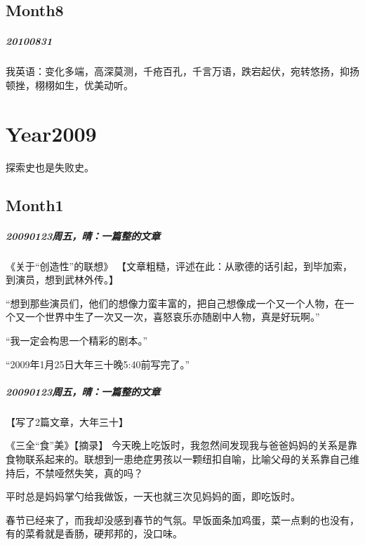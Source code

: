 \documentclass[UTF8]{Diaries}
\begin{document}
\section{Month8}
\paragraph{20100831}

我英语：变化多端，高深莫测，千疮百孔，千言万语，跌宕起伏，宛转悠扬，抑扬顿挫，栩栩如生，优美动听。 





\chapter{Year2009}

探索史也是失败史。

\section{Month1}


\paragraph{20090123周五，晴：一篇整的文章}

《关于“创造性”的联想》
【文章粗糙，评述在此：从歌德的话引起，到毕加索，到演员，想到武林外传。】

“想到那些演员们，他们的想像力蛮丰富的，把自己想像成一个又一个人物，在一个又一个世界中生了一次又一次，喜怒哀乐亦随剧中人物，真是好玩啊。”

“我一定会构思一个精彩的剧本。”

“2009年1月25日大年三十晚5:40前写完了。”

\paragraph{20090123周五，晴：一篇整的文章}

【写了2篇文章，大年三十】

《三全“食”美》【摘录】
今天晚上吃饭时，我忽然间发现我与爸爸妈妈的关系是靠食物联系起来的。联想到一患绝症男孩以一颗纽扣自喻，比喻父母的关系靠自己维持后，不禁哑然失笑，真的吗？

平时总是妈妈掌勺给我做饭，一天也就三次见妈妈的面，即吃饭时。

春节已经来了，而我却没感到春节的气氛。早饭面条加鸡蛋，菜一点剩的也没有，有的菜肴就是香肠，硬邦邦的，没口味。
\end{document}
